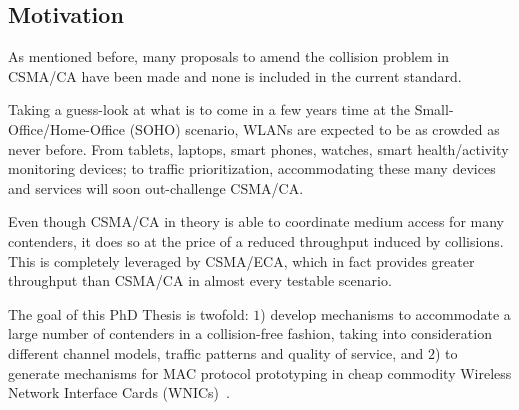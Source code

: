 \subsection{Motivation}\label{motivation}
As mentioned before, many proposals to amend the collision problem in CSMA/CA have been made and none is included in the current standard.

Taking a guess-look at what is to come in a few years time at the Small-Office/Home-Office (SOHO) scenario, WLANs are expected to be as crowded as never before. From tablets, laptops, smart phones, watches, smart health/activity monitoring devices; to traffic prioritization, accommodating these many devices and services will soon out-challenge CSMA/CA.

Even though CSMA/CA in theory is able to coordinate medium access for many contenders, it does so at the price of a reduced throughput induced by collisions. This is completely leveraged by CSMA/ECA, which in fact provides greater throughput than CSMA/CA in almost every testable scenario.

The goal of this PhD Thesis is twofold: $1$) develop mechanisms to accommodate a large number of contenders in a collision-free fashion, taking into consideration different channel models, traffic patterns and quality of service, and $2$) to generate mechanisms for MAC protocol prototyping in cheap commodity Wireless Network Interface Cards (WNICs)~\cite{WMP}.

% 



